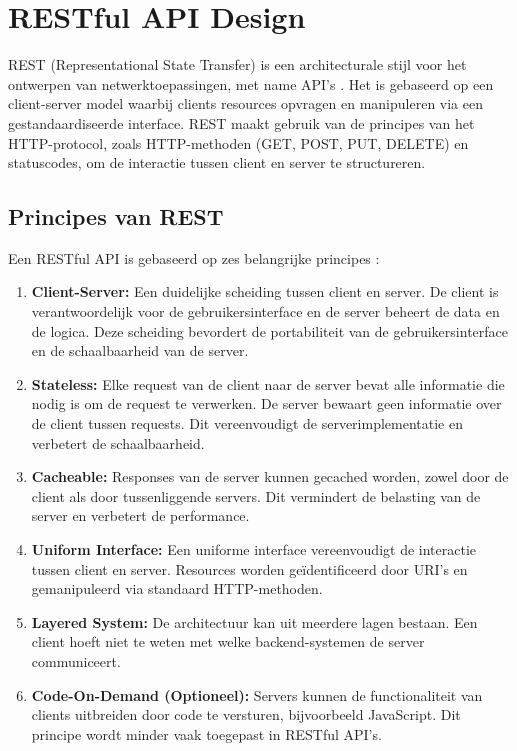 \section{RESTful API Design}

REST (Representational State Transfer) is een architecturale stijl voor het ontwerpen van netwerktoepassingen, met name API's \autocite{Fielding2000}. Het is gebaseerd op een client-server model waarbij clients resources opvragen en manipuleren via een gestandaardiseerde interface. REST maakt gebruik van de principes van het HTTP-protocol, zoals HTTP-methoden (GET, POST, PUT, DELETE) en statuscodes, om de interactie tussen client en server te structureren.

\subsection{Principes van REST}

Een RESTful API is gebaseerd op zes belangrijke principes \autocite{Fielding2000}:

\begin{enumerate}
  \item \textbf{Client-Server:} Een duidelijke scheiding tussen client en server. De client is verantwoordelijk voor de gebruikersinterface en de server beheert de data en de logica. Deze scheiding bevordert de portabiliteit van de gebruikersinterface en de schaalbaarheid van de server.
  \item \textbf{Stateless:} Elke request van de client naar de server bevat alle informatie die nodig is om de request te verwerken. De server bewaart geen informatie over de client tussen requests. Dit vereenvoudigt de serverimplementatie en verbetert de schaalbaarheid.
  \item \textbf{Cacheable:} Responses van de server kunnen gecached worden, zowel door de client als door tussenliggende servers. Dit vermindert de belasting van de server en verbetert de performance.
  \item \textbf{Uniform Interface:} Een uniforme interface vereenvoudigt de interactie tussen client en server. Resources worden geïdentificeerd door URI's en gemanipuleerd via standaard HTTP-methoden.
  \item \textbf{Layered System:} De architectuur kan uit meerdere lagen bestaan. Een client hoeft niet te weten met welke backend-systemen de server communiceert.
  \item \textbf{Code-On-Demand (Optioneel):} Servers kunnen de functionaliteit van clients uitbreiden door code te versturen, bijvoorbeeld JavaScript. Dit principe wordt minder vaak toegepast in RESTful API's.
\end{enumerate}

